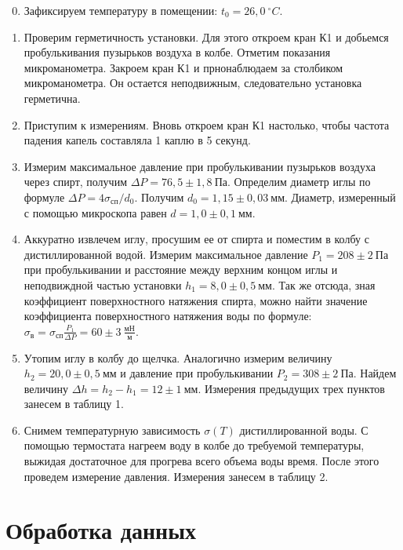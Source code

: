 \documentclass[14pt, a4paper]{report}
\begin{document}
\begin{enumerate}

\setcounter{enumi}{-1}

\item Зафиксируем температуру в помещении: $t_0=26,0\ ^\circ C$.

\item Проверим герметичность установки. Для этого откроем кран К1 и добьемся пробулькивания пузырьков воздуха в колбе. Отметим показания микроманометра. Закроем кран К1 и прнонаблюдаем за столбиком микроманометра. Он остается неподвижным, следовательно установка герметична.

\item Приступим к измерениям. Вновь откроем кран К1 настолько, чтобы частота падения капель составляла 1 каплю в 5 секунд. 

\item Измерим максимальное давление при пробулькивании пузырьков воздуха через спирт, получим $\Delta P=76,5\pm1,8\ Па$. Определим диаметр иглы по формуле $\Delta P=4\sigma_{сп}/d_0$. Получим $d_0=1,15\pm0,03\ мм$. Диаметр, измеренный с помощью микроскопа равен $d=1,0\pm0,1\ мм$.

\item Аккуратно извлечем иглу, просушим ее от спирта и поместим в колбу с дистиллированной водой. Измерим максимальное давление $P_1=208\pm2\ Па$ при пробулькивании и расстояние между верхним концом иглы и неподвиждной частью установки $h_1=8,0\pm0,5\ мм$. Так же отсюда, зная коэффициент поверхностного натяжения спирта, можно найти значение коэффициента поверхностного натяжения воды по формуле: $\sigma_в=\sigma_{сп}\frac{P_1}{\Delta P}=60\pm3\ \frac{мН}{м}$.

\item Утопим иглу в колбу до щелчка. Аналогично измерим величину $h_2=20,0\pm0,5\ мм$ и давление при пробулькивании $P_2=308\pm2\ Па$. Найдем величину $\Delta h = h_2-h_1=12\pm1\ мм$. Измерения предыдущих трех пунктов занесем в таблицу 1.

\item Снимем температурную зависимость $\sigma(T)$ дистиллированной воды. С помощью термостата нагреем воду в колбе до требуемой температуры, выжидая достаточное для прогрева всего объема воды время. После этого проведем измерение давления. Измерения занесем в таблицу 2.	

\end{enumerate}

\section{Обработка данных}
\end{document}
